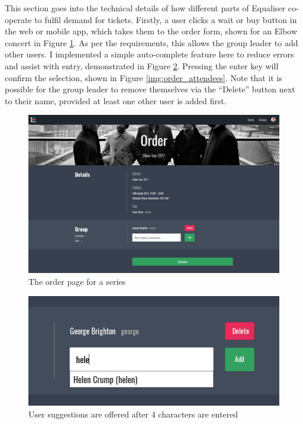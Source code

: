 \documentclass[12pt,a4paper]{bhamdissertation}
\begin{document}

This section goes into the technical details of how different parts of Equaliser co-operate to fulfil demand for tickets. Firstly, a user clicks a wait or buy button in the web or mobile app, which takes them to the order form, shown for an Elbow concert in Figure \ref{img:order}. As per the requirements, this allows the group leader to add other users. I implemented a simple auto-complete feature here to reduce errors and assist with entry, demonstrated in Figure \ref{img:order_autocomplete}. Pressing the enter key will confirm the selection, shown in Figure \ref{img:order_attendees}. Note that it is possible for the group leader to remove themselves via the ``Delete'' button next to their name, provided at least one other user is added first.

\begin{figure}[!htbp]
    \centering
    \includegraphics[width=1\linewidth]{img/order.png}
    \caption{The order page for a series}
    \label{img:order}
\end{figure}

\begin{figure}[!htbp]
    \centering
    \includegraphics[width=1\linewidth]{img/order_autocomplete.png}
    \caption{User suggestions are offered after 4 characters are entered}
    \label{img:order_autocomplete}
\end{figure}
\end{document}
